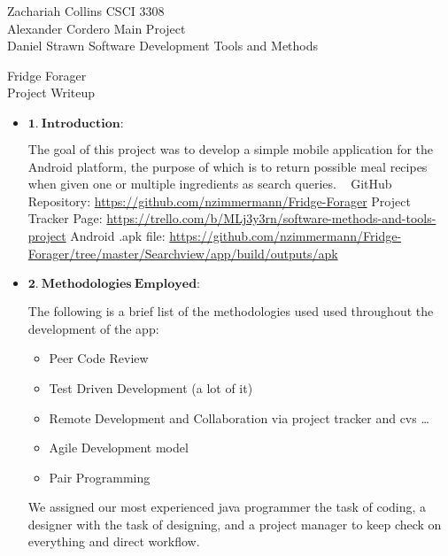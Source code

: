\documentclass[a4paper,11pt]{article}
\begin{document}
\noindent
Zachariah Collins	\hfill CSCI 3308 \\
Alexander Cordero	\hfill Main Project \\
Daniel Strawn		\hfill Software Development Tools and Methods \\

\begin{center}
\LARGE
Fridge Forager
\\
\Large
Project Writeup
\end{center}

\begin{itemize}
\large
\item $\mathbf{1.\ Introduction:}$

\parindent 30pt
The goal of this project was to develop a simple mobile application for the Android platform, the purpose of which is to return possible meal recipes when given one or multiple ingredients as search queries.
\
\newline
\newline
GitHub Repository:
\newline
\url{https://github.com/nzimmermann/Fridge-Forager}
\newline
\newline
Project Tracker Page:
\newline
\url{https://trello.com/b/MLj3y3rn/software-methods-and-tools-project}
\newline
\newline
Android .apk file: 
\newline
\url{https://github.com/nzimmermann/Fridge-Forager/tree/master/Searchview/app/build/outputs/apk}
\newline
\item $\mathbf{2.\ Methodologies\ Employed:}$

\parindent 30pt
The following is a brief list of the methodologies used used throughout the development of the app:

\begin{itemize}
\item Peer Code Review
\item Test Driven Development (a lot of it)
\item Remote Development and Collaboration via project tracker and cvs \ldots
\item Agile Development model
\item Pair Programming
\end{itemize}
We assigned our most experienced java programmer the task of coding, a designer with the task of designing, and a project manager to keep check on everything and direct workflow.


\end{itemize}
\end{document}
